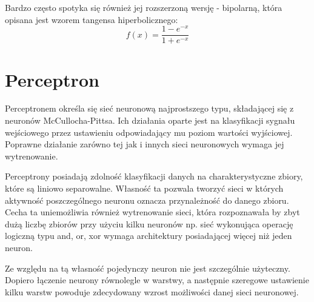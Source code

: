 Bardzo często spotyka się również jej rozszerzoną wersję - bipolarną, która opisana jest wzorem tangensa hiperbolicznego:
$$ 
f(x) = \frac{1 - e^{-x}}{1 + e^{-x}}
$$


\section{Perceptron}
Perceptronem określa się sieć neuronową najprostszego typu, składającej się z neuronów McCullocha-Pittsa. Ich działania oparte jest na klasyfikacji sygnału wejściowego przez ustawieniu odpowiadający mu poziom wartości wyjściowej. Poprawne działanie zarówno tej jak i innych sieci neuronowych wymaga jej wytrenowanie. 


Perceptrony posiadają zdolność klasyfikacji danych na charakterystyczne zbiory, które są liniowo separowalne. Własność ta pozwala tworzyć sieci w których aktywność poszczególnego neuronu oznacza przynależność do danego zbioru. Cecha ta uniemożliwia również wytrenowanie sieci, która rozpoznawała by zbyt dużą liczbę zbiorów przy użyciu kilku neuronów np. sieć wykonująca operację logiczną typu and, or, xor wymaga architektury posiadającej więcej niż jeden neuron. 

Ze względu na tą własność pojedynczy neuron nie jest szczególnie użyteczny. Dopiero łączenie neurony równolegle w warstwy, a następnie szeregowe ustawienie kilku warstw powoduje zdecydowany wzrost możliwości danej sieci neuronowej. 








